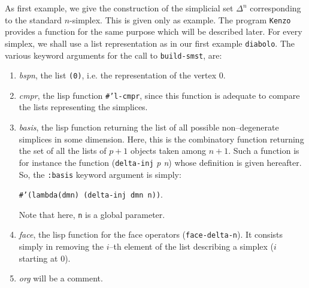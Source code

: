 As first example, we give the construction of the simplicial set $\Delta^n$  cor\-res\-pon\-ding to the 
standard $n$-simplex. This is given only as example. The program {\tt Kenzo} provides a function
for the same purpose which will be described later.
For every simplex, we shall use a list representation as in our first example {\tt diabolo}. The various 
keyword arguments for the call to {\tt build-smst}, are:
\newpage
\begin{enumerate}
\item {\em bspn}, the list {\tt (0)}, i.e. the representation of the vertex $0$.
\item {\em cmpr}, the lisp function  {\tt \#'l-cmpr}, since this function is adequate to compare the
lists representing the simplices.
\item {\em basis}, the lisp function returning the list of all possible 
non--degenerate simplices in some dimension. Here, this is the combinatory function returning the set 
of all the lists of $p+1$ objects taken among $n+1$. 
Such a function is for instance the function  ({\tt delta-inj} {\em p n}) whose definition is given
hereafter. So, the  {\tt :basis} keyword argument is simply:
\par {\footnotesize\tt \#'(lambda(dmn) (delta-inj dmn n))}.
\par
Note that here, {\tt n} is a global parameter.
\item  {\em face}, the lisp function for the face operators ({\tt face-delta-n}). It consists simply in
removing the $i$--th element of the list describing a simplex ($i$ starting at $0$).
\item  {\em org} will be a comment.
\end{enumerate}

